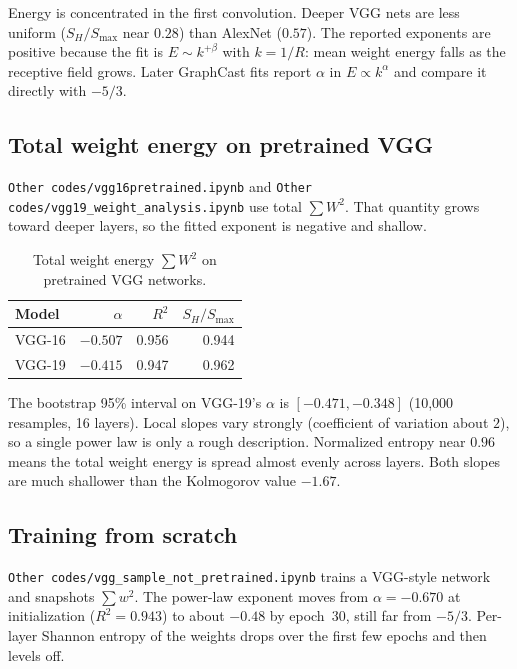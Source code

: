 \documentclass[11pt,a4paper]{article}
\begin{document}
Energy is concentrated in the first convolution.
Deeper VGG nets are less uniform (\(S_H/S_{\max}\) near \(0.28\)) than AlexNet (\(0.57\)).
The reported exponents are positive because the fit is \(E \sim k^{+\beta}\) with \(k = 1/R\): mean weight energy falls as the receptive field grows.
Later GraphCast fits report \(\alpha\) in \(E \propto k^{\alpha}\) and compare it directly with \(-5/3\).

\subsection{Total weight energy on pretrained VGG}

\texttt{Other codes/vgg16pretrained.ipynb} and \texttt{Other codes/vgg19\_weight\_analysis.ipynb} use total \(\sum W^2\).
That quantity grows toward deeper layers, so the fitted exponent is negative and shallow.

\begin{table}[ht]
  \centering
  \caption{Total weight energy \(\sum W^2\) on pretrained VGG networks.}
  \label{tab:vgg-total}
  \begin{tabular}{lrrr}
    \toprule
    Model & \(\alpha\) & \(R^2\) & \(S_H/S_{\max}\) \\
    \midrule
    VGG-16 & \(-0.507\) & 0.956 & 0.944 \\
    VGG-19 & \(-0.415\) & 0.947 & 0.962 \\
    \bottomrule
  \end{tabular}
\end{table}

The bootstrap 95\% interval on VGG-19's \(\alpha\) is \([-0.471,-0.348]\) (10{,}000 resamples, 16 layers).
Local slopes vary strongly (coefficient of variation about \(2\)), so a single power law is only a rough description.
Normalized entropy near \(0.96\) means the total weight energy is spread almost evenly across layers.
Both slopes are much shallower than the Kolmogorov value \(-1.67\).

\subsection{Training from scratch}

\texttt{Other codes/vgg\_sample\_not\_pretrained.ipynb} trains a VGG-style network and snapshots \(\sum w^2\).
The power-law exponent moves from \(\alpha = -0.670\) at initialization (\(R^2 = 0.943\)) to about \(-0.48\) by epoch~30, still far from \(-5/3\).
Per-layer Shannon entropy of the weights drops over the first few epochs and then levels off.
\end{document}
